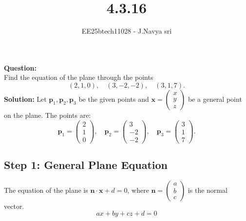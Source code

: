 \documentclass[journal]{IEEEtran}
\begin{document}

\vspace{3cm}

\title{4.3.16}
\author{EE25btech11028 - J.Navya sri}
{\let\newpage\relax\maketitle}




\textbf{Question:} \\
Find the equation of the plane through the points
\[
(2,1,0), \quad (3,-2,-2), \quad (3,1,7).
\]
\textbf{Solution:}
Let $\mathbf{p}_1, \mathbf{p}_2, \mathbf{p}_3$ be the given points and $\mathbf{x} = \begin{pmatrix} x\\y\\z \end{pmatrix}$ be a general point on the plane. The points are:
\[
\mathbf{p}_1 = \begin{pmatrix} 2\\1\\0 \end{pmatrix}, \quad
\mathbf{p}_2 = \begin{pmatrix} 3\\-2\\-2 \end{pmatrix}, \quad %
\mathbf{p}_3 = \begin{pmatrix} 3\\1\\7 \end{pmatrix}.
\]
\subsection*{Step 1: General Plane Equation}
The equation of the plane is $\mathbf{n} \cdot \mathbf{x} + d = 0$, where $\mathbf{n} = \begin{pmatrix} a\\b\\c \end{pmatrix}$ is the normal vector.
\[
ax + by + cz + d = 0 \tag{1}
\]
\end{document}
